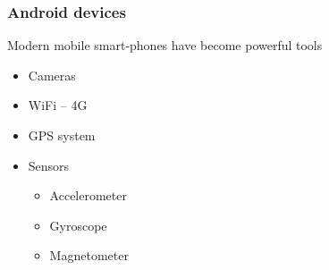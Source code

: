 %
%

\begin{frame}
  \frametitle{Android devices}
  
  Modern mobile smart-phones have become powerful tools

  \begin{itemize}
  \item<2-> Cameras
  \item<3-> WiFi -- 4G
  \item<4-> GPS system
  \item<5-> Sensors
    \begin{itemize}
    \item<6-> Accelerometer
    \item<6-> Gyroscope
    \item<6-> Magnetometer
    \end{itemize}
  \end{itemize}
  

\end{frame}


